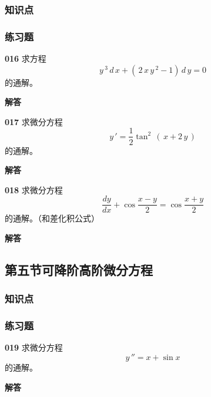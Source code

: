 \documentclass[a4paper,10pt]{article} %
\begin{document}
\subsubsection{知识点}
\subsubsection{练习题}
\par\noindent \textbf{016} \quad 求方程
$$y\,^3\,d\,x+(\,2\,x\,y\,^2-1)\,d\,y = 0$$
的通解。
\par\noindent \textbf{ 解答}





\textheight


\par\noindent \textbf{017} \quad 求微分方程
$$y\,'= \frac{1}{2}\tan ^2\,(\,x+2\,y\,)$$
的通解。
\par\noindent \textbf{ 解答}





\textheight


\par\noindent \textbf{018} \quad 求微分方程
$$\frac{dy}{dx}+\cos \frac{x-y}{2}=\cos \frac{x+y}{2}$$
的通解。（和差化积公式）
\par\noindent \textbf{ 解答}





\textheight


\newpage
\subsection{第五节\quad 可降阶高阶微分方程}
\subsubsection{知识点}
\subsubsection{练习题}
\par\noindent \textbf{019} \quad 求微分方程
$$y\, '' = x+\sin x$$
的通解。
\par\noindent \textbf{ 解答}
\end{document}
